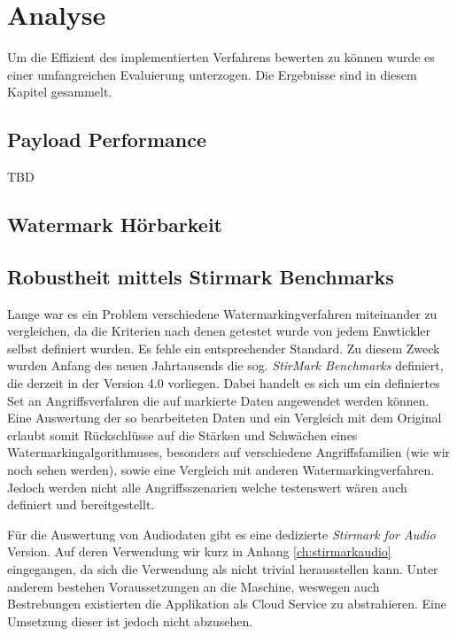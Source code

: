 \chapter{Analyse}
\label{ch:analyse}

Um die Effizient des implementierten Verfahrens bewerten zu können wurde es einer umfangreichen Evaluierung unterzogen. Die Ergebnisse sind in diesem Kapitel gesammelt. 

\section{Payload Performance}
\label{sec:payloadperformance}

TBD

\section{Watermark Hörbarkeit}

\section{Robustheit mittels Stirmark Benchmarks}

Lange war es ein Problem verschiedene Watermarkingverfahren miteinander zu vergleichen, da die Kriterien nach denen getestet wurde von jedem Enwtickler selbst definiert wurden. Es fehle ein entsprechender Standard. Zu diesem Zweck wurden Anfang des neuen Jahrtausends die sog. \textit{StirMark Benchmarks} definiert\cite{petitcolas2000watermarking}\cite{petitcolas2004stirmark}, die derzeit in der Version 4.0 vorliegen. Dabei handelt es sich um ein definiertes Set an Angriffsverfahren die auf markierte Daten angewendet werden können. Eine Auswertung der so bearbeiteten Daten und ein Vergleich mit dem Original erlaubt somit Rückschlüsse auf die Stärken und Schwächen eines Watermarkingalgorithmuses, besonders auf verschiedene Angriffsfamilien (wie wir noch sehen werden), sowie eine Vergleich mit anderen Watermarkingverfahren. Jedoch werden nicht alle Angriffsszenarien welche testenswert wären auch definiert und bereitgestellt\cite{steinebach2002stirmark}.

Für die Auswertung von Audiodaten gibt es eine dedizierte \textit{Stirmark for Audio} Version\cite{stirmarkforaudio}. Auf deren Verwendung wir kurz in Anhang \ref{ch:stirmarkaudio} eingegangen, da sich die Verwendung als nicht trivial herausstellen kann. Unter anderem bestehen Voraussetzungen an die Maschine, weswegen auch Bestrebungen existierten die Applikation als Cloud Service zu abstrahieren\cite{petitcolas2001public}. Eine Umsetzung dieser ist jedoch nicht abzusehen. 

